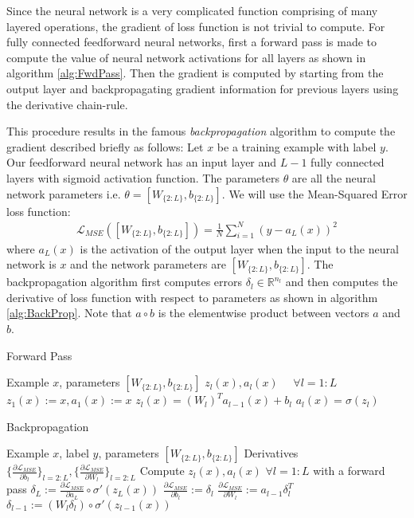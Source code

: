 Since the neural network is a very complicated function comprising of many layered operations, the gradient of loss function is not trivial to compute.
For fully connected feedforward neural networks, first a forward pass is made to compute the value of neural network activations for all layers as shown in algorithm \ref{alg:FwdPass}. Then the gradient is computed by starting from the output layer and backpropagating gradient information for previous layers using the derivative chain-rule.

This procedure results in the famous \textit{backpropagation} algorithm to compute the gradient described briefly as follows:
Let $x$ be a training example with label $y$. Our feedforward neural network has an input layer and $L-1$ fully connected layers with sigmoid activation function. The parameters $\theta$ are all the neural network parameters i.e. $\theta = [W_{\{2:L\}}, b_{\{2:L\}}]$. We will use the Mean-Squared Error loss function:
\begin{align}
\mathcal{L}_{MSE} ([W_{\{2:L\}}, b_{\{2:L\}}]) = \frac{1}{N} \sum_{i=1}^N ( y - a_L(x))^2
\end{align}
where $a_L(x)$ is the activation of the output layer when the input to the neural network is $x$ and the network parameters are $[W_{\{2:L\}}, b_{\{2:L\}}]$.
The backpropagation algorithm first computes errors $\delta_l \in \mathbb{R}^{n_l}$ and then computes the derivative of loss function with respect to parameters as shown in algorithm \ref{alg:BackProp}. Note that $a \circ b$ is the elementwise product between vectors $a$ and $b$.
\begin{algorithm}[tb]
   \caption{Forward Pass}
   \label{alg:FwdPass}
\begin{algorithmic}
    Example $x$, parameters $[W_{\{2:L\}}, b_{\{2:L\}}]$
    $z_l(x), a_l(x) \hspace{16pt} \forall l=1:L$
   \STATE
   \STATE $z_1(x) := x, a_1(x) := x$
   \STATE $z_l(x) = (W_l)^T a_{l-1}(x) + b_l$
   \STATE $a_l(x) = \sigma(z_l)$
   \ENDFOR
\end{algorithmic}
\end{algorithm}
\begin{algorithm}[tb]
   \caption{Backpropagation}
   \label{alg:BackProp}
\begin{algorithmic}
    Example $x$, label $y$, parameters $[W_{\{2:L\}}, b_{\{2:L\}}]$
    Derivatives $\{\frac{\partial \mathcal{L}_{MSE}}{\partial b_l}\}_{l=2:L}, \{\frac{\partial \mathcal{L}_{MSE}}{\partial W_l}\}_{l=2:L}$
   \STATE
   \STATE Compute $z_l(x), a_l(x) \hspace{4pt} \forall l=1:L$ with a forward pass
   \STATE $\delta_L := \frac{\partial \mathcal{L}_{MSE}}{\partial a_L} \circ \sigma'(z_L(x))$
   \STATE $\frac{\partial \mathcal{L}_{MSE}}{\partial b_l} := \delta_l$
   \STATE $\frac{\partial \mathcal{L}_{MSE}}{\partial W_l} := a_{l-1} \delta_l^T$
   \STATE $\delta_{l-1} := (W_l \delta_l) \circ \sigma'(z_{l-1}(x))$
   \ENDFOR
\end{algorithmic}
\end{algorithm}